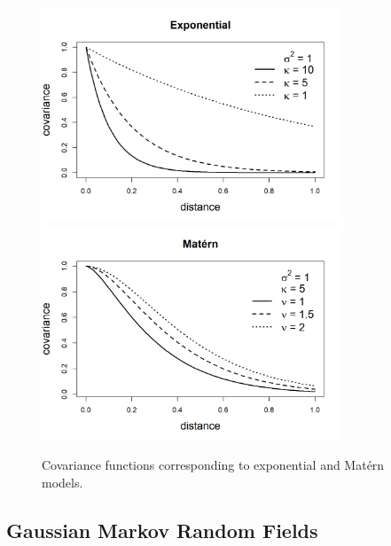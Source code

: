 \begin{figure}
    \centering
    \includegraphics[width=0.8\textwidth]{covariancefunctions-1.png}
    \includegraphics[width=0.8\textwidth]{covariancefunctions-2.png}
    \caption{Covariance functions corresponding to exponential and Matérn models.}
    \label{fig:covariance}
\end{figure}
\subsection{Gaussian Markov Random Fields}

